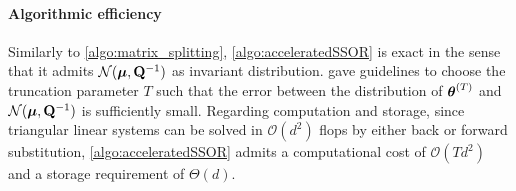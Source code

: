 \documentclass[nohypdvips,onefignum,onetabnum]{siamart171218}
\begin{document}
\paragraph{Algorithmic efficiency}
Similarly to \cref{algo:matrix_splitting}, \cref{algo:acceleratedSSOR} is exact in the sense that it admits $\mathcal{N}(\boldsymbol{\mu},\mathbf{Q}^{-1})$ as invariant distribution.
\cite{Fox2017} gave guidelines to choose the truncation parameter $T$ such that the error between the distribution of $\boldsymbol{\theta}^{(T)}$ and $\mathcal{N}(\boldsymbol{\mu},\mathbf{Q}^{-1})$ is sufficiently small.
Regarding computation and storage, since triangular linear systems can be solved in $\mathcal{O}(d^2)$ flops by either back or forward substitution, \cref{algo:acceleratedSSOR} admits a computational cost of $\mathcal{O}(Td^2)$ and a storage requirement of $\Theta(d)$.
\end{document}
